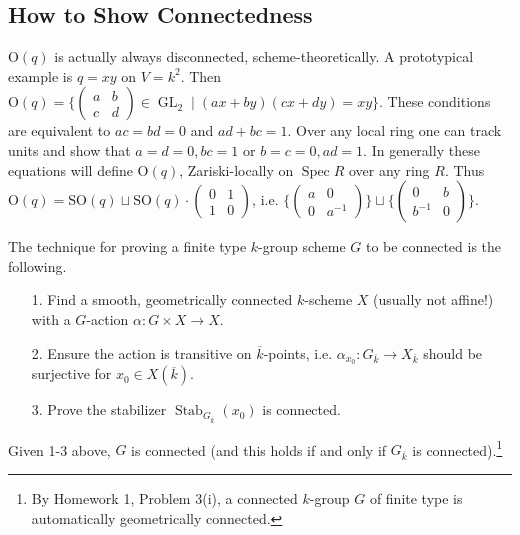 \documentclass[10pt]{article}
\renewcommand{\O}{\mathscr{O}}
\newcommand{\GL}{\operatorname{GL}}
\renewcommand{\(}{\left(}
\renewcommand{\)}{\right)}
\renewcommand{\bar}{\overline}
\newcommand{\Spec}{\operatorname{Spec}}
\newcommand{\Stab}{\operatorname{Stab}}
\renewcommand{\b}{\mathfrak{b}}
\renewcommand{\O}{\mathrm{O}}
\newcommand{\SO}{\mathrm{SO}}
\numberwithin{thm}{subsection}
\begin{document}
\subsection{How to Show Connectedness}
\begin{ex}$\O(q)$ is actually always disconnected, scheme-theoretically.
A prototypical example is $q=xy$ on $V=k^2$.
Then $\O(q)=\{\(\begin{smallmatrix}a&b\\c&d\end{smallmatrix}\)\in\GL_2\mid(ax+by)(cx+dy)=xy\}$.
These conditions are equivalent to $ac=bd=0$ and $ad+bc=1$.
Over any local ring one can track units and show that
$a=d=0,bc=1$ or $b=c=0,ad=1$.
In generally these equations will define $\O(q)$, Zariski-locally on $\Spec R$
over any ring $R$.
Thus $\O(q)=\SO(q)\sqcup \SO(q)\cdot\(\begin{smallmatrix}0&1\\1&0\end{smallmatrix}\)$,
i.e. $\{\(\begin{smallmatrix}a&0\\0&a^{-1}\end{smallmatrix}\)\}\sqcup
\{\(\begin{smallmatrix}0&b\\b^{-1}&0\end{smallmatrix}\)\}$.
\end{ex}
The technique for proving a finite type $k$-group scheme $G$ to be connected is the following.
\begin{itemize}
\item[1.] Find a smooth, geometrically connected $k$-scheme $X$
(usually not affine!) with a $G$-action $\alpha:G\times X\to X$.
\item[2.] Ensure the action is transitive on $\bar k$-points,
i.e. $\alpha_{x_0}:G_{\bar k}\to X_{\bar k}$ should be surjective
for $x_0\in X(\bar k)$.
\item[3.] Prove the stabilizer $\Stab_{G_{\bar k}}(x_0)$ is connected.
\end{itemize}
\begin{prop}Given 1-3 above, $G$ is connected
(and this holds if and only if $G_{\bar k}$ is connected).\footnote{By Homework 1, Problem 3(i), a connected $k$-group $G$ of finite type is automatically geometrically connected.}
\end{prop}
\end{document}
